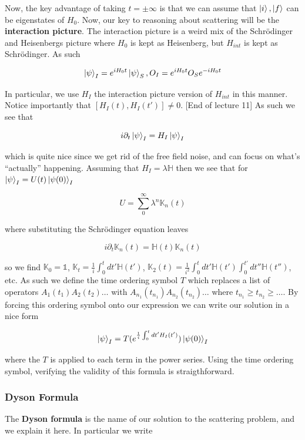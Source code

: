 \documentclass{article}
\theoremstyle{definition}
\begin{document}
Now, the key advantage of taking $t=\pm \infty$ is that we can assume that
$\ket{i}, \ket{f}$ can be eigenstates of $H_0$. Now, our key to reasoning about
scattering will be the \textbf{interaction picture}. The interaction picture is
a weird mix of the Schr{\"o}dinger and Heisenbergs picture where $H_0$ is kept
as Heisenberg, but $H_{int}$ is kept as Schr{\"o}dinger. As such

$$ \ket{\psi}_I = e^{iH_0 t} \ket{\psi}_S, O_I = e^{iH_0t} O_S e^{-iH_0t} $$

In particular, we use $H_I$ the interaction picture version of $H_{int}$ in this
manner. Notice importantly that $[H_I(t), H_I(t')] \neq 0$. [End of lecture 11]
As such we see that

$$ i\partial_t \ket{\psi}_I = H_I \ket{\psi}_I $$

which is quite nice since we get rid of the free field noise, and can focus on
what's ``actually'' happening. Assuming that $H_I = \lambda \mathbb{H}$ then we
see that for$\ket{\psi}_I = U(t) \ket{\psi(0)}_I$

$$ U = \sum_0^\infty \lambda^n \mathbb{K}_n(t) $$

where substituting the Schr{\"o}dinger equation leaves

$$ i \partial_t \mathbb{K}_n(t) = \mathbb{H}(t) \mathbb{K}_n(t) $$

so we find $\mathbb{K}_0 = \mathds{1}$, $\mathbb{K}_t = \frac{1}{i} \int_0^t dt'
\mathbb{H}(t')$, $\mathbb{K}_2(t) = \frac{1}{i^2} \int_0^t dt' \mathbb{H}(t')
\int_0^{t'}dt'' \mathbb{H}(t'')$, etc. As such we define the time ordering
symbol $T$ which replaces a list of operators $A_1(t_1) A_2(t_2) \dots$ with
$A_{n_1}(t_{n_1}) A_{n_2}(t_{n_2}) \dots$ where $t_{n_1} \geq t_{n_2} \geq
\dots$. By forcing this ordering symbol onto our expression we can write our
solution in a nice form

$$ \ket{\psi}_I = T(e^{\frac{1}{i} \int_0^t dt' H_I(t')}) \ket{\psi(0)}_I $$

where the $T$ is applied to each term in the power series. Using the time
ordering symbol, verifying the validity of this formula is straigthforward.

\subsubsection{Dyson Formula}

The \textbf{Dyson formula} is the name of our solution to the scattering
problem, and we explain it here. In particular we write
\end{document}
